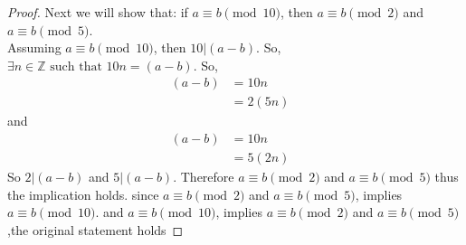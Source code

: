 \documentclass{article}
\newcommand{\ints}{\mathbb{Z}}
\newcommand{\st}{\text{ such that }}
\begin{document}
\begin{enumerate}
\begin{proof}
			Next we will show that: if $a \equiv b \pmod{10}$, then  $a \equiv b \pmod{2}$ and $a \equiv b \pmod{5}$.\\
			Assuming $a \equiv b \pmod{10}$, then $10|(a-b)$. So, $\exists n \in \ints \st 10n=(a-b)$. 
			So, 
			\begin{align*}
				(a-b) &= 10n &\\
				&= 2(5n)
			\end{align*}
			and 
			\begin{align*}
				(a-b) &= 10n&\\
				&= 5(2n)
			\end{align*}
			So $2|(a-b)$ and $5|(a-b)$. Therefore $a \equiv b \pmod{2}$ and $a \equiv b \pmod{5}$ thus the implication holds. 
			since $a \equiv b \pmod{2}$ and $a \equiv b \pmod{5}$, implies  $a \equiv b \pmod{10}$. and 
			$a \equiv b \pmod{10}$, implies  $a \equiv b \pmod{2}$ and $a \equiv b \pmod{5}$,the  original statement holds
		\end{proof}
	\end{enumerate}
	
\end{document}
